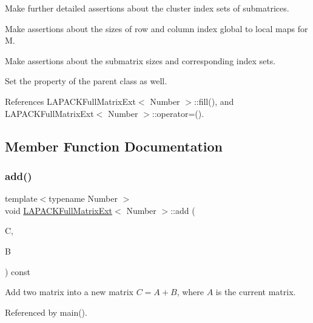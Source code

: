 Make further detailed assertions about the cluster index sets of submatrices.

Make assertions about the sizes of row and column index global to local maps for {\ttfamily M}.

Make assertions about the submatrix sizes and corresponding index sets.

Set the property of the parent class as well.

References L\+A\+P\+A\+C\+K\+Full\+Matrix\+Ext$<$ Number $>$\+::fill(), and L\+A\+P\+A\+C\+K\+Full\+Matrix\+Ext$<$ Number $>$\+::operator=().



\subsection{Member Function Documentation}
\mbox{\label{classLAPACKFullMatrixExt_a824a7a919666c8af3df5723175f6201e}} 
\subsubsection{\texorpdfstring{add()}{add()}\hspace{0.1cm}{\footnotesize\ttfamily [1/4]}}
{\footnotesize\ttfamily template$<$typename Number $>$ \\
void \hyperlink{classLAPACKFullMatrixExt}{L\+A\+P\+A\+C\+K\+Full\+Matrix\+Ext}$<$ Number $>$\+::add (\begin{DoxyParamCaption}\item[{\hyperlink{classLAPACKFullMatrixExt}{L\+A\+P\+A\+C\+K\+Full\+Matrix\+Ext}$<$ Number $>$ \&}]{C,  }\item[{const \hyperlink{classLAPACKFullMatrixExt}{L\+A\+P\+A\+C\+K\+Full\+Matrix\+Ext}$<$ Number $>$ \&}]{B }\end{DoxyParamCaption}) const}

Add two matrix into a new matrix $C = A + B$, where $A$ is the current matrix. 

Referenced by main().

\mbox{\label{classLAPACKFullMatrixExt_a793c6b5e30522c2ae653df0e80ed6ab3}} 

